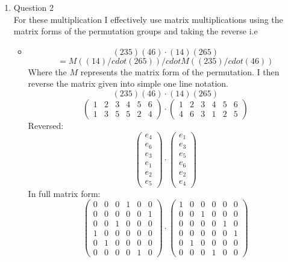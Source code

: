 \documentclass[12pt]{article}
\begin{document}
\begin{enumerate}
\item Question 2
\\ For these multiplication I effectively use matrix multiplications using the matrix forms of the permutation groups and taking the reverse i.e 
\begin{itemize}
\item $$ (235)(46)\cdot(14)(265) $$
$$ = M((14)/cdot(265)) /cdot M((235)/cdot(46)) $$
Where the $M$ represents the matrix form of the permutation. I then reverse the matrix given into simple one line notation.
$$ (235)(46)\cdot(14)(265) $$
$$ \left( \begin{array}{cccccc} 1 & 2 & 3 & 4 & 5&  6 \\ 1 & 3 & 5 & 5 & 2 & 4  \end{array}\right) \cdot \left( \begin{array}{cccccc} 1 & 2 & 3 & 4 & 5&  6 \\ 4 & 6 & 3 & 1 & 2 & 5  \end{array}\right) $$
Reversed: 
$$ \left( \begin{array}{c} e_4 \\ e_6 \\ e_3 \\ e_1 \\ e_2 \\ e_5 \end{array}\right) \cdot \left( \begin{array}{c} e_1 \\ e_3 \\ e_5 \\ e_6 \\ e_2 \\ e_4 \end{array}\right) $$
In full matrix form:
$$ \left( \begin{array}{cccccc} 0&0&0&1&0&0 \\ 0&0&0&0&0&1 \\ 0&0&1&0&0&0 \\ 1&0&0&0&0&0 \\ 0&1&0&0&0&0 \\ 0&0&0&0&1&0 \end{array}\right) \cdot \left( \begin{array}{cccccc} 1&0&0&0&0&0 \\ 0&0&1&0&0&0 \\ 0&0&0&0&1&0 \\ 0&0&0&0&0&1 \\ 0&1&0&0&0&0 \\ 0&0&0&1&0&0 \end{array}\right) $$

\end{itemize}
\end{enumerate}
\end{document}
